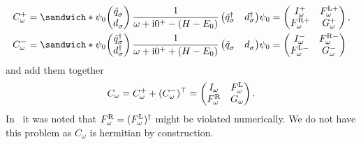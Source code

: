 \begin{subequations}
    \begin{align}
        C^+_\omega
         & =
        \sandwich*
        {\psi_0}
        {
            \begin{pmatrix}
                \tilde q^{\pdag}_\sigma \\
                d^{\pdag}_\sigma
            \end{pmatrix}
            \frac{1}{\omega + \mi0^+ - (H - E_0)}
            \begin{pmatrix}
                \tilde q^\dag_\sigma & d^\dag_\sigma
            \end{pmatrix}
        }
        {\psi_0}
        =
        \begin{pmatrix}
            I^+_\omega      & F^{\mL+}_\omega \\
            F^{\mR+}_\omega & G^+_\omega
        \end{pmatrix}, \\
        C^-_\omega
         & =
        \sandwich*
        {\psi_0}
        {
            \begin{pmatrix}
                \tilde q^\dag_\sigma \\
                d^\dag_\sigma
            \end{pmatrix}
            \frac{1}{\omega + \mi0^+ + (H - E_0)}
            \begin{pmatrix}
                \tilde q^{\pdag}_\sigma & d^{\pdag}_\sigma
            \end{pmatrix}
        }
        {\psi_0}
        =
        \begin{pmatrix}
            I^-_\omega      & F^{\mR-}_\omega \\
            F^{\mL-}_\omega & G^-_\omega
        \end{pmatrix}
    \end{align}
\end{subequations}
and add them together
\begin{equation}
    C_\omega
    =
    C^+_\omega + (C^-_\omega)^\top
    =
    \begin{pmatrix}
        I_\omega       & F^{\mathrm{L}}_\omega \\
        F^{\mathrm{R}}_\omega & G_\omega
    \end{pmatrix}.
\end{equation}
In~\cite{Kugler2022} it was noted that $F^{\mathrm{R}}_\omega = (F^{\mathrm{L}}_\omega)^\dag$
might be violated numerically.
We do not have this problem as $C_\omega$ is hermitian by construction.

